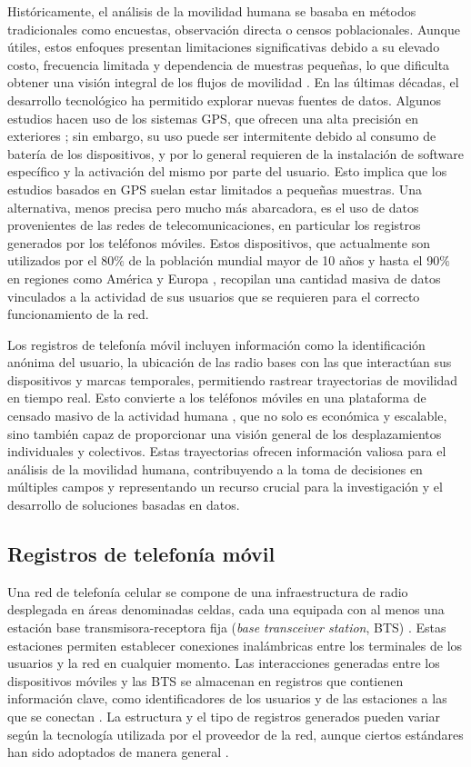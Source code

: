 Históricamente, el análisis de la movilidad humana se basaba en métodos tradicionales como encuestas, observación directa o censos poblacionales. Aunque útiles, estos enfoques presentan limitaciones significativas debido a su elevado costo, frecuencia limitada y dependencia de muestras pequeñas, lo que dificulta obtener una visión integral de los flujos de movilidad \cite{asgari2013survey}. En las últimas décadas, el desarrollo tecnológico ha permitido explorar nuevas fuentes de datos. Algunos estudios hacen uso de los sistemas GPS, que ofrecen una alta precisión en exteriores \cite{gong2012gps}; sin embargo, su uso puede ser intermitente debido al consumo de batería de los dispositivos, y por lo general requieren de la instalación de software específico y la activación del mismo por parte del usuario. Esto implica que los estudios basados en GPS suelan estar limitados a pequeñas muestras. Una alternativa, menos precisa pero mucho más abarcadora, es el uso de datos provenientes de las redes de telecomunicaciones, en particular los registros generados por los teléfonos móviles. Estos dispositivos, que actualmente son utilizados por el 80$\%$ de la población mundial mayor de 10 años y hasta el 90$\%$ en regiones como América y Europa \cite{ITU2024}, recopilan una cantidad masiva de datos vinculados a la actividad de sus usuarios \cite{toole2015path} que se requieren para el correcto funcionamiento de la red.

Los registros de telefonía móvil incluyen información como la identificación anónima del usuario, la ubicación de las radio bases con las que interactúan sus dispositivos y marcas temporales, permitiendo rastrear trayectorias de movilidad en tiempo real. Esto convierte a los teléfonos móviles en una plataforma de censado masivo de la actividad humana \cite{doyle2014population}, que no solo es económica y escalable, sino también capaz de proporcionar una visión general de los desplazamientos individuales y colectivos. Estas trayectorias ofrecen información valiosa para el análisis de la movilidad humana, contribuyendo a la toma de decisiones en múltiples campos y representando un recurso crucial para la investigación y el desarrollo de soluciones basadas en datos.

\subsection{Registros de telefonía móvil}

Una red de telefonía celular se compone de una infraestructura de radio desplegada en áreas denominadas celdas, cada una equipada con al menos una estación base transmisora-receptora fija (\textit{base transceiver station}, BTS) \cite{sharma2012cell}. Estas estaciones permiten establecer conexiones inalámbricas entre los terminales de los usuarios y la red en cualquier momento. Las interacciones generadas entre los dispositivos móviles y las BTS se almacenan en registros que contienen información clave, como identificadores de los usuarios y de las estaciones a las que se conectan \cite{yuan2013characterizing}. La estructura y el tipo de registros generados pueden variar según la tecnología utilizada por el proveedor de la red, aunque ciertos estándares han sido adoptados de manera general \cite{durive2021sistema}.

